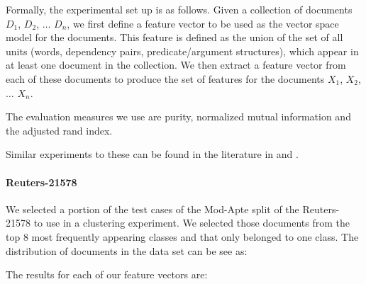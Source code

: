 \documentclass[11pt]{article}
\begin{document}
Formally, the experimental set up is as follows. Given a collection of documents $D_1$, $D_2$, $\dots$ $D_n$, we first define a feature vector to be used as the vector space model for the documents. This feature is defined as the union of the set of all units (words, dependency pairs, predicate/argument structures), which appear in at least one document in the collection. We then extract a feature vector from each of these documents to produce the set of features for the documents $X_1$, $X_2$, $\dots$ $X_n$. 

The evaluation measures we use are purity, normalized mutual information and the adjusted rand index. 

Similar experiments to these can be found in the literature in \cite{Huang2008} and \cite{Hofmann2000}. 


\paragraph{Reuters-21578}

We selected a portion of the test cases of the Mod-Apte split of the Reuters-21578 to use in a clustering experiment. We selected those documents from the top 8 most frequently appearing classes and that only belonged to one class. The distribution of documents in the data set can be see as:

\begin{figure}[H]
\centering
{}
\end{figure}

The results for each of our feature vectors are: 
\end{document}
